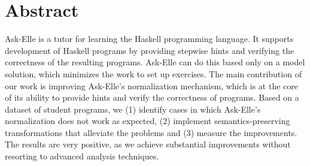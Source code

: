 \begingroup
\let\clearpage\relax
\let\cleardoublepage\relax
\let\cleardoublepage\relax

\chapter*{Abstract}

Ask-Elle is a tutor for learning the Haskell programming language. It supports development of Haskell programs by providing stepwise hints and verifying the correctness of the resulting programs. Ask-Elle can do this based only on a model solution, which minimizes the work to set up exercises. The main contribution of our work is improving Ask-Elle's normalization mechanism, which is at the core of its ability to provide hints and verify the correctness of programs. Based on a dataset of student programs, we (1) identify cases in which Ask-Elle's normalization does not work as expected, (2) implement semantics-preserving transformations that alleviate the problems and (3) measure the improvements. The results are very positive, as we achieve substantial improvements without resorting to advanced analysis techniques.

\endgroup

\vfill